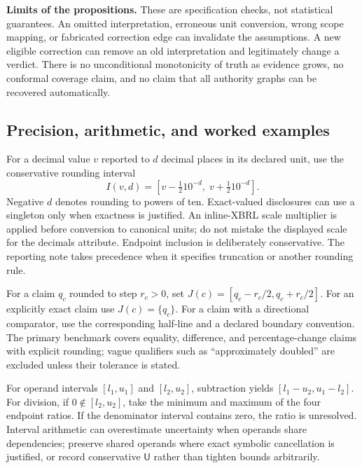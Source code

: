 \documentclass[11pt,a4paper]{article}
\newcommand{\pbreak}{\clearpage}
\newcommand{\lead}[1]{\textbf{\color{navy}#1}}
\newcommand{\Ulabel}{\mathsf{U}}
\begin{document}
\lead{Limits of the propositions.} These are specification checks, not statistical guarantees. An omitted interpretation, erroneous unit conversion, wrong scope mapping, or fabricated correction edge can invalidate the assumptions. A new eligible correction can remove an old interpretation and legitimately change a verdict. There is no unconditional monotonicity of truth as evidence grows, no conformal coverage claim, and no claim that all authority graphs can be recovered automatically.

\pbreak
\subsection{Precision, arithmetic, and worked examples}
For a decimal value $v$ reported to $d$ decimal places in its declared unit, use the conservative rounding interval
\[
I(v,d)=[v-\tfrac12 10^{-d},\;v+\tfrac12 10^{-d}].
\]
Negative $d$ denotes rounding to powers of ten. Exact-valued disclosures can use a singleton only when exactness is justified. An inline-XBRL scale multiplier is applied before conversion to canonical units; do not mistake the displayed scale for the decimals attribute. Endpoint inclusion is deliberately conservative. The reporting note takes precedence when it specifies truncation or another rounding rule.

For a claim $q_c$ rounded to step $r_c>0$, set $J(c)=[q_c-r_c/2,q_c+r_c/2]$. For an explicitly exact claim use $J(c)=\{q_c\}$. For a claim with a directional comparator, use the corresponding half-line and a declared boundary convention. The primary benchmark covers equality, difference, and percentage-change claims with explicit rounding; vague qualifiers such as “approximately doubled” are excluded unless their tolerance is stated.

For operand intervals $[l_1,u_1]$ and $[l_2,u_2]$, subtraction yields $[l_1-u_2,u_1-l_2]$. For division, if $0\notin[l_2,u_2]$, take the minimum and maximum of the four endpoint ratios. If the denominator interval contains zero, the ratio is unresolved. Interval arithmetic can overestimate uncertainty when operands share dependencies; preserve shared operands where exact symbolic cancellation is justified, or record conservative $\Ulabel$ rather than tighten bounds arbitrarily.
\end{document}
